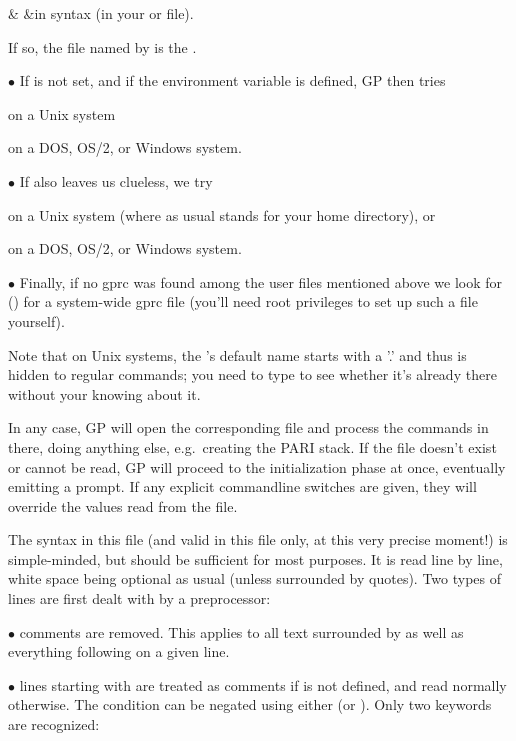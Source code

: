 \+& &in  syntax
(in your  or  file).\cr

\noindent If so, the file named by  is the .

\noindent$\bullet$ If  is not set, and if the environment variable
 is defined, GP then tries

 on a Unix system

 on a DOS, OS/2, or Windows system.

\noindent$\bullet$ If  also leaves us clueless, we try

\strut{} on a Unix system (where as usual \kbd{\til} stands for
your home directory), or

 on a DOS, OS/2, or Windows system.

\noindent$\bullet$ Finally, if no gprc was found among the user files
mentioned above we look for  ()
for a system-wide gprc file (you'll need root privileges to set up such a
file yourself).

Note that on Unix systems, the 's default name starts with a '.' and
thus is hidden to regular  commands; you need to type  to
see whether it's already there without your knowing about it.

In any case, GP will open the corresponding file and process the commands in
there,  doing anything else, e.g.~creating the PARI stack. If
the file doesn't exist or cannot be read, GP will proceed to the
initialization phase at once, eventually emitting a prompt. If any explicit
commandline switches are given, they will override the values read from the
 file.

The syntax in this file (and valid in this file only, at this very precise
moment!) is simple-minded, but should be sufficient for most purposes. It
is read line by line, white space being optional as usual (unless surrounded
by quotes). Two types of lines are first dealt with by a preprocessor:

$\bullet$ comments are removed. This applies to all text surrounded by
\kbd{/*~\dots~*/} as well as everything following \kbd{\bs\bs} on a given
line.

$\bullet$ lines starting with   are treated as
comments if  is not defined, and read normally otherwise. The
condition can be negated using either  (or ). Only
two keywords are recognized:

